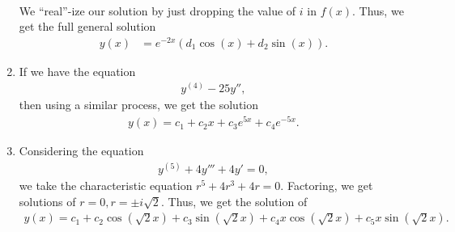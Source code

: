 \documentclass[10pt]{mypackage}
\begin{document}
\begin{example}
\begin{enumerate}[(1)]
\begin{align*}
      \end{align*}
      We ``real''-ize our solution by just dropping the value of $i$ in $f(x)$. Thus, we get the full general solution
      \begin{align*}
        y(x) &= e^{-2x}\left(d_1\cos\left(x\right) + d_2\sin\left(x\right)\right).
      \end{align*}
    \item If we have the equation
      \begin{align*}
        y^{(4)} - 25y'',
      \end{align*}
      then using a similar process, we get the solution
      \begin{align*}
        y(x) = c_1 + c_2 x + c_3e^{5x} + c_4e^{-5x}.
      \end{align*}
    \item Considering the equation
      \begin{align*}
        y^{(5)} + 4y''' + 4y' = 0,
      \end{align*}
      we take the characteristic equation $r^{5}+ 4r^3 + 4r = 0$. Factoring, we get solutions of $r=0,r=\pm i\sqrt{2}$. Thus, we get the solution of
      \begin{align*}
        y(x) = c_1 + c_2\cos\left(\sqrt{2}x\right) + c_3\sin\left(\sqrt{2}x\right) + c_4x\cos\left(\sqrt{2}x\right) + c_5x\sin\left(\sqrt{2}x\right).
      \end{align*}
  \end{enumerate}
\end{example}
\end{document}

